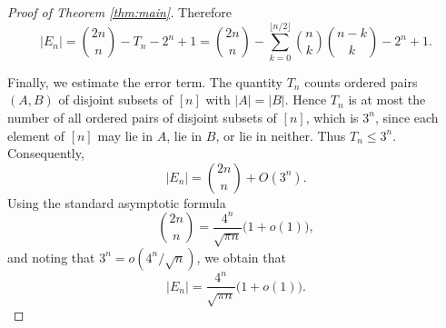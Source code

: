 \documentclass[10pt,a4paper]{amsart}
\begin{document}
\begin{proof}[Proof of Theorem \ref{thm:main}]
Therefore
\[
|E_n|
=
\binom{2n}{n}
-
T_n
-
2^n+1
=
\binom{2n}{n}
-
\sum_{k=0}^{\lfloor n/2\rfloor}
\binom{n}{k}\binom{n-k}{k}
-
2^n+1.
\]

Finally, we estimate the error term. The quantity $T_n$ counts ordered pairs $(A,B)$ of disjoint subsets of $[n]$ with $|A|=|B|$. Hence $T_n$ is at most the number of all ordered pairs of disjoint subsets of $[n]$, which is $3^n$, since each element of $[n]$ may lie in $A$, lie in $B$, or lie in neither. Thus
$T_n\leq 3^n$.
Consequently,
\[
|E_n|
=
\binom{2n}{n}+O(3^n).
\]
Using the standard asymptotic formula
\[
\binom{2n}{n}
=
\frac{4^n}{\sqrt{\pi n}}\bigl(1+o(1)\bigr),
\]
and noting that $3^n=o(4^n/\sqrt n)$, we obtain that 
\[
|E_n|
=
\frac{4^n}{\sqrt{\pi n}}\bigl(1+o(1)\bigr).
\]
\end{proof}
\end{document}
